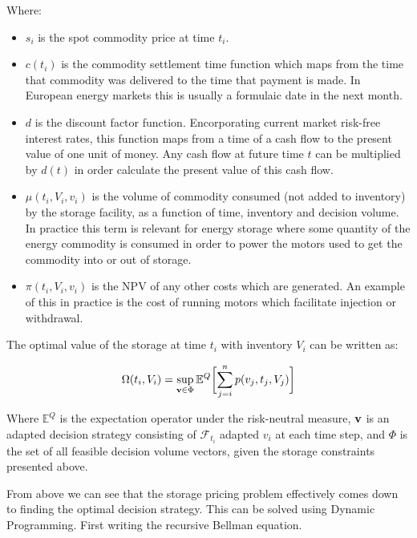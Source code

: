 \documentclass{article}
\begin{document}
Where:
\begin{itemize}
    \item $s_i$ is the spot commodity price at time $t_i$.
    \item $c(t_i)$ is the commodity settlement time function which maps from the 
    time that commodity was delivered to the time that payment is made. In European
    energy markets this is usually a formulaic date in the next month.
    \item $d$ is the discount factor function. Encorporating current market risk-free
    interest rates, this function maps from a time of a cash flow to the present value
    of one unit of money. Any cash flow at future time $t$ can be multiplied by $d(t)$
    in order calculate the present value of this cash flow.
    \item $\mu(t_i, V_i, v_i)$ is the volume of commodity consumed (not added to inventory)
    by the storage facility, as a function of time, inventory and decision volume. In practice
    this term is relevant for energy storage where some quantity of the energy commodity
    is consumed in order to power the motors used to get the commodity into or out of storage.
    \item $\pi(t_i, V_i, v_i)$ is the NPV of any other costs which are generated. An example of
    this in practice is the cost of running motors which facilitate injection or withdrawal.
\end{itemize}

The optimal value of the storage at time $t_i$ with inventory $V_i$ can be written as:

\begin{equation}
    \Omega(t_i, V_i) =  \sup_{\mathbf{v} \in \Phi} \mathbb{E}^Q \biggl[\sum^n_{j=i}p(v_j, t_j, V_j) \biggr]
\end{equation}

Where $\mathbb{E}^Q$ is the expectation operator under the risk-neutral measure, $\mathbf{v}$ is 
an adapted decision strategy consisting of $\mathcal{F}_{t_i}$ adapted $v_i$ at each time step, 
and $\Phi$ is the set of all feasible decision volume vectors, given the storage 
constraints presented above.

\bigskip
From above %
we can see that the storage pricing problem effectively comes down to finding the optimal 
decision strategy. This can be solved using Dynamic Programming. First writing the recursive
Bellman equation.
\end{document}
